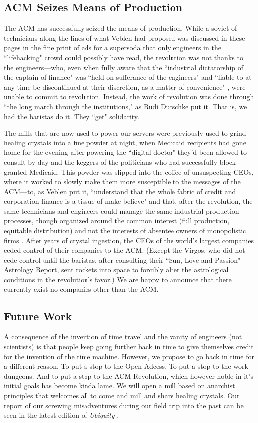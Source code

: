 \subsection{ACM Seizes Means of Production}
The ACM has successfully seized the means of production. While a soviet of 
technicians along the lines of what Veblen had proposed was discussed in these 
pages in the fine print of ads for a supersoda that only engineers in the 
``lifehacking" crowd could possibly have read, the revolution was not thanks
to the engineers---who, even when fully aware that the ``industrial dictatorship
of the captain of finance" was ``held on sufferance of the engineers" and ``liable
to at any time be discontinued at their discretion, as a matter of convenience" \cite{Veblen}, were
unable to commit to revolution.
Instead, the work of revolution was done through ``the long march through the institutions,"
as Rudi Dutschke put it. That is, we had the baristas do it. They ``get" solidarity.

The mills that are now used to power our servers were previously used to grind
healing crystals into a fine powder at night, when Medicaid recipients had gone home
for the evening after powering the ``digital doctor" they'd been allowed to consult by day
and the keggers of the politicians who had successfully block-granted Medicaid.
This powder was slipped into the coffee of unsuspecting CEOs, where it worked to
slowly make them more susceptible to the messages of the ACM---to, as Veblen put it,
``understand that the whole fabric of credit and corporation finance is a tissue of make-believe"
and that, after the revolution, the same technicians and engineers could manage the same
industrial production processes, though organized around the common interest (full production,
equitable distribution) and not the interests of absentee owners of monopolistic firms \cite{Veblen}.
After years of crystal ingestion, the CEOs of the world's largest companies 
ceded control of their companies to the ACM. (Except the Virgos, who did not cede control until
the baristas, after consulting their ``Sun, Love and Passion" Astrology Report, sent rockets into space to forcibly alter the astrological conditions in the revolution's favor.)
We are happy to announce that there currently exist no companies other than the
ACM.

\subsection{Future Work}
A consequence of the invention of time travel \cite{timetravel} \cite{genesis} \cite{cave} and the vanity
of engineers (not scientists) \cite{sci-shirt} is that people keep going
further back in time to give themselves credit for the invention of the time
machine.
However, we propose to go back in time for a different reason.
To put a stop to the Open Adcess.
To put a stop to the work dungeons.
And to put a stop to the ACM Revolution, which however noble in it's initial
goals has become  kinda lame.
We will open a mill based on anarchist principles that welcomes all to come and
mill and share healing crystals.
Our report of our screwing misadventures during our field trip into the past
can be seen in the latest edition of \textit{Ubiquity} \cite{future-ub}.

